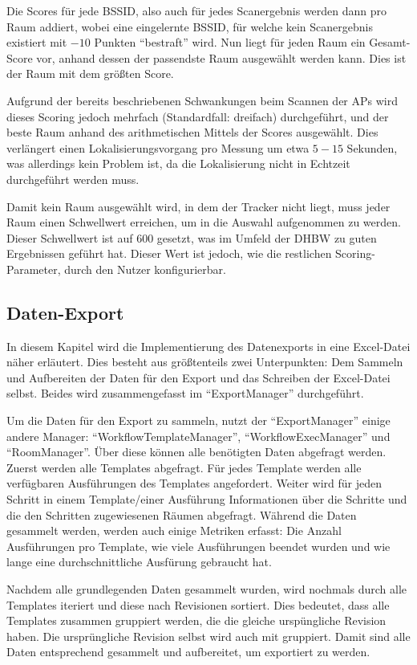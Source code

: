 Die Scores für jede \gls{BSSID}, also auch für jedes Scanergebnis werden dann pro Raum addiert,
wobei eine eingelernte \gls{BSSID}, für welche kein Scanergebnis existiert mit $-10$ Punkten
\enquote{bestraft} wird. Nun liegt für jeden Raum ein Gesamt-Score vor, anhand dessen der passendste
Raum ausgewählt werden kann. Dies ist der Raum mit dem größten Score.

Aufgrund der bereits beschriebenen Schwankungen beim Scannen der \glspl{AP} wird dieses Scoring
jedoch mehrfach (Standardfall: dreifach) durchgeführt, und der beste Raum anhand des arithmetischen
Mittels der Scores ausgewählt. Dies verlängert einen Lokalisierungsvorgang pro Messung um etwa
$5-15$ Sekunden, was allerdings kein Problem ist, da die Lokalisierung nicht in Echtzeit
durchgeführt werden muss.

Damit kein Raum ausgewählt wird, in dem der Tracker nicht liegt, muss jeder Raum einen Schwellwert
erreichen, um in die Auswahl aufgenommen zu werden. Dieser Schwellwert ist auf $600$ gesetzt, was im
Umfeld der \gls{DHBW} zu guten Ergebnissen geführt hat. Dieser Wert ist jedoch, wie die restlichen
Scoring-Parameter, durch den Nutzer konfigurierbar.

\subsection{Daten-Export}

In diesem Kapitel wird die Implementierung des Datenexports in eine Excel-Datei näher erläutert.
Dies besteht aus größtenteils zwei Unterpunkten: Dem Sammeln und Aufbereiten der Daten für den Export und das
Schreiben der Excel-Datei selbst.
Beides wird zusammengefasst im \enquote{ExportManager} durchgeführt.

Um die Daten für den Export zu sammeln, nutzt der \enquote{ExportManager} einige andere Manager:
\enquote{WorkflowTemplateManager}, \enquote{WorkflowExecManager} und \enquote{RoomManager}.
Über diese können alle benötigten Daten abgefragt werden.
Zuerst werden alle Templates abgefragt.
Für jedes Template werden alle verfügbaren Ausführungen des Templates angefordert.
Weiter wird für jeden Schritt in einem Template/einer Ausführung Informationen über die Schritte und die den Schritten
zugewiesenen Räumen abgefragt.
Während die Daten gesammelt werden, werden auch einige Metriken erfasst: Die Anzahl Ausführungen pro Template,
wie viele Ausführungen beendet wurden und wie lange eine durchschnittliche Ausfürung gebraucht hat.

Nachdem alle grundlegenden Daten gesammelt wurden, wird nochmals durch alle Templates iteriert und diese nach Revisionen sortiert.
Dies bedeutet, dass alle Templates zusammen gruppiert werden, die die gleiche urspüngliche Revision haben.
Die ursprüngliche Revision selbst wird auch mit gruppiert.
Damit sind alle Daten entsprechend gesammelt und aufbereitet, um exportiert zu werden.

